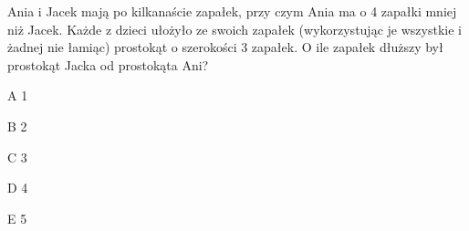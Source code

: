 \begin{tresc}
Ania i Jacek mają po kilkanaście zapałek, przy czym Ania ma o 4 zapałki mniej niż Jacek. Każde z dzieci ułożyło ze swoich zapałek (wykorzystując je wszystkie i żadnej nie łamiąc) prostokąt o szerokości 3 zapałek. O ile zapałek dłuższy był prostokąt Jacka od prostokąta Ani?
\end{tresc}
\begin{wariant}{A} 1 \end{wariant}
\begin{wariant}{B} 2 \end{wariant}
\begin{wariant}{C} 3 \end{wariant}
\begin{wariant}{D} 4 \end{wariant}
\begin{wariant}{E} 5 \end{wariant}

